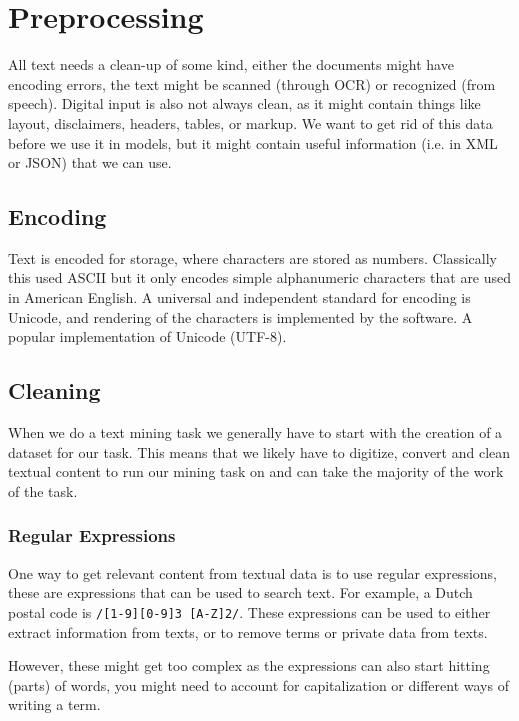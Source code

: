 \section{Preprocessing}

All text needs a clean-up of some kind, either the documents might
have encoding errors, the text
might be scanned (through OCR) or recognized (from speech). Digital
input is also not always clean,
as it might contain things like layout, disclaimers, headers, tables,
or markup. We want to get rid
of this data before we use it in models, but it might contain useful
information (i.e. in XML or JSON)
that we can use.

\subsection{Encoding}

Text is encoded for storage, where characters are stored as numbers.
Classically this used ASCII but it
only encodes simple alphanumeric characters that are used in American
English. A universal and independent
standard for encoding is Unicode, and rendering of the characters is
implemented by the software. A popular
implementation of Unicode (UTF-8).

\subsection{Cleaning}

When we do a text mining task we generally have to start with the
creation of a dataset for our task.
This means that we likely have to digitize, convert and clean textual
content to run our mining task on
and can take the majority of the work of the task.

\subsubsection{Regular Expressions}

One way to get relevant content from textual data is to use regular
expressions, these are expressions
that can be used to search text. For example, a Dutch postal code is
\texttt{/[1-9][0-9]{3} [A-Z]{2}/}.
These expressions can be used to either extract information from
texts, or to remove terms or private
data from texts.

However, these might get too complex as the expressions can also start
hitting (parts) of words, you might need to account for capitalization
or different ways of writing a term.

